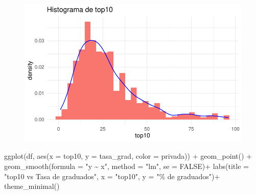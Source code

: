 \documentclass[
  letterpaper,
  DIV=11,
  numbers=noendperiod]{scrartcl}
\newenvironment{Shaded}{\begin{snugshade}}{\end{snugshade}}
\newcommand{\AttributeTok}[1]{\textcolor[rgb]{0.40,0.45,0.13}{#1}}
\newcommand{\ConstantTok}[1]{\textcolor[rgb]{0.56,0.35,0.01}{#1}}
\newcommand{\FunctionTok}[1]{\textcolor[rgb]{0.28,0.35,0.67}{#1}}
\newcommand{\NormalTok}[1]{\textcolor[rgb]{0.00,0.23,0.31}{#1}}
\newcommand{\SpecialCharTok}[1]{\textcolor[rgb]{0.37,0.37,0.37}{#1}}
\newcommand{\StringTok}[1]{\textcolor[rgb]{0.13,0.47,0.30}{#1}}
\begin{document}
\begin{figure}[H]

{\centering \includegraphics{TP_final_files/figure-pdf/unnamed-chunk-15-1.pdf}

}

\end{figure}

\begin{Shaded}
\begin{Highlighting}[]
\FunctionTok{ggplot}\NormalTok{(df, }\FunctionTok{aes}\NormalTok{(}\AttributeTok{x =}\NormalTok{ top10, }\AttributeTok{y =}\NormalTok{ tasa\_grad, }\AttributeTok{color =}\NormalTok{ privada)) }\SpecialCharTok{+}
  \FunctionTok{geom\_point}\NormalTok{() }\SpecialCharTok{+} 
  \FunctionTok{geom\_smooth}\NormalTok{(}\AttributeTok{formula =} \StringTok{"y \textasciitilde{} x"}\NormalTok{, }\AttributeTok{method =} \StringTok{"lm"}\NormalTok{, }\AttributeTok{se =} \ConstantTok{FALSE}\NormalTok{)}\SpecialCharTok{+}
  \FunctionTok{labs}\NormalTok{(}\AttributeTok{title =} \StringTok{"top10 vs Tasa de graduados"}\NormalTok{,}
       \AttributeTok{x =} \StringTok{"top10"}\NormalTok{,}
       \AttributeTok{y =} \StringTok{"\% de graduados"}\NormalTok{)}\SpecialCharTok{+}
  \FunctionTok{theme\_minimal}\NormalTok{()}
\end{Highlighting}
\end{Shaded}
\end{document}
